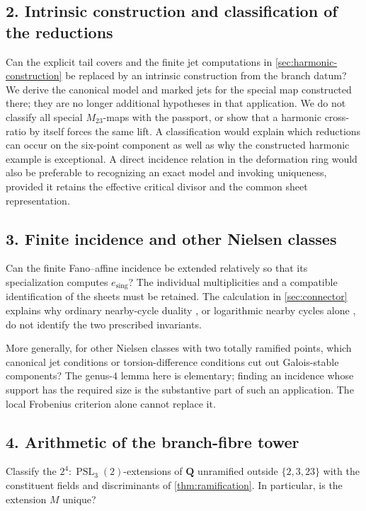 \documentclass[11pt]{amsart}
\theoremstyle{definition}
\theoremstyle{remark}
\newcommand{\QQ}{\mathbf Q}
\newcommand{\PSL}{\operatorname{PSL}}
\begin{document}
\subsection*{2. Intrinsic construction and classification of the reductions}
Can the explicit tail covers and the finite jet computations in
\cref{sec:harmonic-construction} be replaced by an intrinsic
construction from the branch datum?  We derive the canonical model
and marked jets for the special map constructed there; they are no
longer additional hypotheses in that application.
We do not classify all special $M_{23}$-maps with the passport, or
show that a harmonic cross-ratio by itself forces the same lift.
A classification would explain which reductions can occur on the
six-point component as well as why the constructed harmonic example
is exceptional.  A direct incidence relation in the deformation ring
would also be preferable to recognizing an exact model and invoking
uniqueness, provided it retains the effective critical divisor and
the common sheet representation.

\subsection*{3. Finite incidence and other Nielsen classes}
Can the finite Fano--affine incidence be extended relatively so that
its specialization computes $e_{\mathrm{sing}}$?
The individual multiplicities and a compatible identification of
the sheets must be retained.
The calculation in \cref{sec:connector} explains why ordinary
nearby-cycle duality \cite{LuZheng}, or logarithmic nearby cycles
alone \cite{Nakayama}, do not identify the two prescribed invariants.

More generally, for other Nielsen classes with two totally ramified
points, which canonical jet conditions or torsion-difference
conditions cut out Galois-stable components?
The genus-$4$ lemma here is elementary; finding an incidence whose
support has the required size is the substantive part of such an
application.  The local Frobenius criterion alone cannot replace it.

\subsection*{4. Arithmetic of the branch-fibre tower}
Classify the $2^4{:}\PSL_3(2)$-extensions of $\QQ$ unramified outside
$\{2,3,23\}$ with the constituent fields and discriminants of
\cref{thm:ramification}.  In particular, is the extension $M$ unique?
\end{document}
